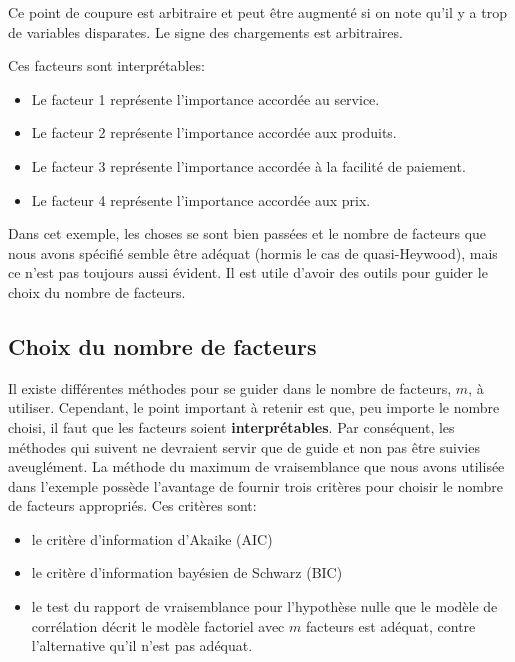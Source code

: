 \documentclass[
  11pt,
  letterpaper,
]{scrbook}
\providecommand{\tightlist}{%
  \setlength{\itemsep}{0pt}\setlength{\parskip}{0pt}}\usepackage{longtable,booktabs,array}
\theoremstyle{definition}
\theoremstyle{remark}
\begin{document}
Ce point de coupure est arbitraire et peut être augmenté si on note
qu'il y a trop de variables disparates. Le signe des chargements est
arbitraires.

Ces facteurs sont interprétables:

\begin{itemize}
\tightlist
\item
  Le facteur 1 représente l'importance accordée au service.
\item
  Le facteur 2 représente l'importance accordée aux produits.
\item
  Le facteur 3 représente l'importance accordée à la facilité de
  paiement.
\item
  Le facteur 4 représente l'importance accordée aux prix.
\end{itemize}

Dans cet exemple, les choses se sont bien passées et le nombre de
facteurs que nous avons spécifié semble être adéquat (hormis le cas de
quasi-Heywood), mais ce n'est pas toujours aussi évident. Il est utile
d'avoir des outils pour guider le choix du nombre de facteurs.

\hypertarget{choix-du-nombre-de-facteurs}{%
\subsection{Choix du nombre de
facteurs}\label{choix-du-nombre-de-facteurs}}

Il existe différentes méthodes pour se guider dans le nombre de
facteurs, \(m\), à utiliser. Cependant, le point important à retenir est
que, peu importe le nombre choisi, il faut que les facteurs soient
\textbf{interprétables}. Par conséquent, les méthodes qui suivent ne
devraient servir que de guide et non pas être suivies aveuglément. La
méthode du maximum de vraisemblance que nous avons utilisée dans
l'exemple possède l'avantage de fournir trois critères pour choisir le
nombre de facteurs appropriés. Ces critères sont:

\begin{itemize}
\tightlist
\item
  le critère d'information d'Akaike (AIC)
\item
  le critère d'information bayésien de Schwarz (BIC)
\item
  le test du rapport de vraisemblance pour l'hypothèse nulle que le
  modèle de corrélation décrit le modèle factoriel avec \(m\) facteurs
  est adéquat, contre l'alternative qu'il n'est pas adéquat.
\end{itemize}
\end{document}
